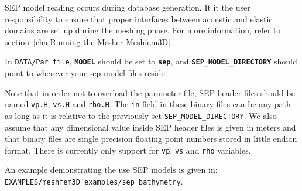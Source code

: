 SEP model reading occurs during database generation. It it the user responsibility
to ensure that proper interfaces between acoustic and elastic domains are set up
during the meshing phase. For more information, refer to
section~\ref{cha:Running-the-Mesher-Meshfem3D}.

In \texttt{DATA/Par\_file}, \texttt{\textbf{MODEL}} should be set to \texttt{\textbf{sep}},
and \texttt{\textbf{SEP\_MODEL\_DIRECTORY}} should point to wherever your sep model files reside.

Note that in order not to overload the parameter file, SEP header files
should be named \texttt{vp.H}, \texttt{vs.H} and \texttt{rho.H}. The \texttt{in} field
in these binary files can be any path as long as it is relative to
the previously set \texttt{SEP\_MODEL\_DIRECTORY}.
We also assume that any dimensional value inside SEP header files is given in meters and
that binary files are single precision floating point numbers stored in little endian format.
There is currently only support for \texttt{vp}, \texttt{vs} and \texttt{rho} variables.

An example demonstrating the use SEP models is given in:
\texttt{EXAMPLES/meshfem3D\_examples/sep\_bathymetry}.


